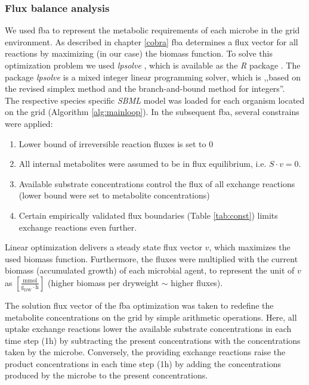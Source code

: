 \subsubsection{Flux balance analysis}
We used fba to represent the metabolic requirements of each microbe in the grid environment.
As described in chapter \ref{cobra} fba determines a flux vector for all reactions by maximizing (in our case) the biomass function.
To solve this optimization problem we used \textit{lpsolve} \cite{lpsolve}, which is available as the \textit{R} package \cite{Rlpsolve}.
The package \textit{lpsolve} is a mixed integer linear programming solver, which is ,,based on the revised simplex method and the branch-and-bound method for integers''\cite{lpsolvedocu}.\\
The respective species specific \textit{SBML} model was loaded for each organism located on the grid (Algorithm \hyperref[alg:mainloop]{\ref{alg:mainloop}}).
In the subsequent fba, several constrains were applied:
\begin{enumerate}
  \item Lower bound of irreversible reaction fluxes is set to $0$
  \item All internal metabolites were assumed to be in flux equilibrium, i.e. $S\cdot v=0$.
  \item Available substrate concentrations control the flux of all exchange reactions (lower bound were set to metabolite concentrations)
  \item Certain empirically validated flux boundaries (Table \hyperref[tab:const]{\ref{tab:const}}) limits exchange reactions even further.
\end{enumerate}
Linear optimization delivers a steady state flux vector $v$, which maximizes the used biomass function. Furthermore, the fluxes were multiplied with the current biomass (accumulated growth) of each microbial agent, to represent the unit of $v$ as $[\frac{\mathrm{mmol}}{\mathrm{g_{DW} \cdot \mathrm{h}}}]$ (higher biomass per dryweight $\sim$ higher fluxes).

The solution flux vector of the fba optimization was taken to redefine the metabolite concentrations on the grid by simple arithmetic operations. Here, all uptake exchange reactions lower the available substrate concentrations in each time step (1\;h) by subtracting the present concentrations with the concentrations taken by the microbe. Conversely, the providing exchange reactions raise the product concentrations in each time step (1\;h) by adding the concentrations produced by the microbe to the present concentrations.

